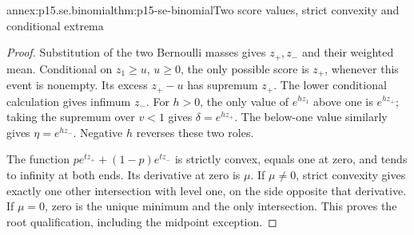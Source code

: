 \begin{annexitem}{annex:p15.se.binomial}{thm:p15-se-binomial}{Two score values, strict convexity and conditional extrema}
\begin{proof}
Substitution of the two Bernoulli masses gives \(z_+,z_-\) and their
weighted mean. Conditional on \(z_1\geq u\), \(u\geq0\), the only
possible score is \(z_+\), whenever this event is nonempty. Its excess
\(z_+-u\) has supremum \(z_+\). The lower conditional calculation
gives infimum \(z_-\). For \(h>0\), the only value of \(e^{hz_1}\)
above one is \(e^{hz_+}\); taking the supremum over \(v<1\)
gives \(\delta=e^{hz_+}\). The below-one value similarly gives
\(\eta=e^{hz_-}\). Negative \(h\) reverses these two roles.

The function \(pe^{tz_+}+(1-p)e^{tz_-}\) is strictly convex,
equals one at zero, and tends to infinity at both ends. Its derivative
at zero is \(\mu\). If \(\mu\ne0\), strict convexity gives exactly
one other intersection with level one, on the side opposite that derivative.
If \(\mu=0\), zero is the unique minimum and the only intersection.
This proves the root qualification, including the midpoint exception.
\end{proof}
\end{annexitem}

